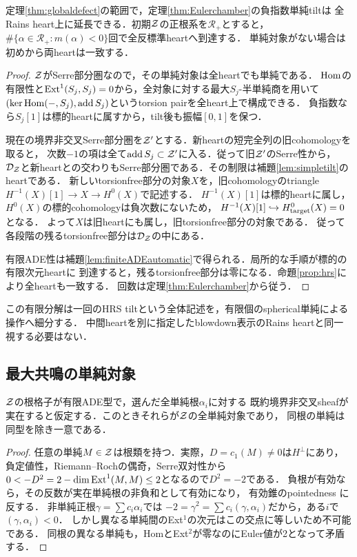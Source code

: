 \begin{theorem}\label{thm:globalADEtilts}
定理\ref{thm:globaldefect}の範囲で，定理\ref{thm:Eulerchamber}の負指数単純tiltは
全Rains heart上に延長できる．初期$\mathcal Z$の正根系を$\mathcal R_+$とすると，
$\#\{\alpha\in\mathcal R_+:m(\alpha)<0\}$回で全反標準heartへ到達する．
単純対象がない場合は初めから両heartは一致する．
\end{theorem}
\begin{proof}
$\mathcal Z$がSerre部分圏なので，その単純対象は全heartでも単純である．
$\operatorname{Hom}$の有限性と$\operatorname{Ext}^1(S_j,S_j)=0$から，全対象に対する最大$S_j$-半単純商を用いて
$(\ker\operatorname{Hom}(-,S_j),\operatorname{add} S_j)$というtorsion pairを全heart上で構成できる．
負指数なら$S_j[1]$は標的heartに属すから，tilt後も振幅$[0,1]$を保つ．

現在の境界非交叉Serre部分圏を$\mathcal Z'$とする．新heartの短完全列の旧cohomologyを取ると，
次数$-1$の項は全て$\operatorname{add} S_j\subset\mathcal Z'$に入る．従って旧$\mathcal Z'$のSerre性から，
$\mathcal D_{\mathcal Z}$と新heartとの交わりもSerre部分圏である．その制限は補題\ref{lem:simpletilt}のheartである．
新しいtorsionfree部分の対象$X$を，旧cohomologyのtriangle
$H^{-1}(X)[1]\to X\to H^0(X)$で記述する．
$H^{-1}(X)[1]$は標的heartに属し，$H^0(X)$の標的cohomologyは負次数にないため，
$H^{-1}(X)[1]\hookrightarrow H^0_{\rm target}(X)=0$となる．
よって$X$は旧heartにも属し，旧torsionfree部分の対象である．
従って各段階の残るtorsionfree部分は$\mathcal D_{\mathcal Z}$の中にある．

有限ADE性は補題\ref{lem:finiteADEautomatic}で得られる．局所的な手順が標的の有限次元heartに
到達すると，残るtorsionfree部分は零になる．命題\ref{prop:hrs}により全heartも一致する．
回数は定理\ref{thm:Eulerchamber}から従う．
\end{proof}
この有限分解は一回のHRS tiltという全体記述を，有限個のspherical単純による操作へ細分する．
中間heartを別に指定したblowdown表示のRains heartと同一視する必要はない．

\subsection{最大共鳴の単純対象}

\begin{proposition}[全単純根が実在する場合の網羅性]\label{prop:maximalrootexhaustion}
$\mathcal Z$の根格子が有限ADE型で，選んだ全単純根$\alpha_i$に対する
既約境界非交叉sheafが実在すると仮定する．このときそれらが$\mathcal Z$の全単純対象であり，
同根の単純は同型を除き一意である．
\end{proposition}
\begin{proof}
任意の単純$M\in\mathcal Z$は根類を持つ．実際，$D=c_1(M)\ne0$は$H^\perp$にあり，
負定値性，Riemann--Rochの偶奇，Serre双対性から
$0<-D^2=2-\dim\operatorname{Ext}^1(M,M)\le2$となるので$D^2=-2$である．
負根が有効なら，その反数が実在単純根の非負和として有効になり，
有効錐のpointedness \cite[Proposition 7.19]{Rains}に反する．
非単純正根$\gamma=\sum c_i\alpha_i$では
$-2=\gamma^2=\sum c_i(\gamma,\alpha_i)$だから，ある$i$で$(\gamma,\alpha_i)<0$．
しかし異なる単純間のExt$^1$の次元はこの交点に等しいため不可能である．
同根の異なる単純も，HomとExt$^2$が零なのにEuler値が2となって矛盾する．
\end{proof}

